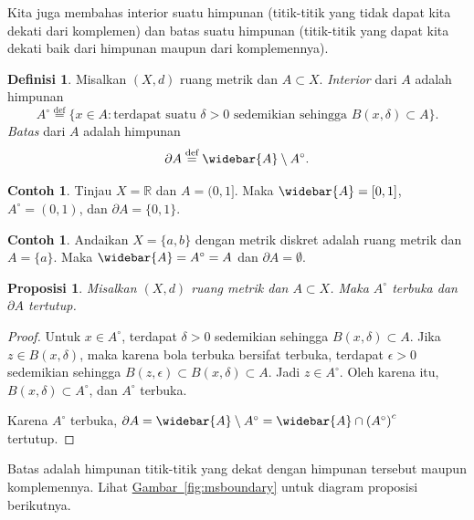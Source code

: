 \documentclass[12pt,openany]{book}
\newcommand{\R}{{\mathbb{R}}}
\newcommand{\myindex}[1]{#1\index{#1}}
\theoremstyle{plain}
\newtheorem{prop}[thm]{Proposisi}
\theoremstyle{remark}
\theoremstyle{definition}
\newtheorem{defn}[thm]{Definisi}
\theoremstyle{exercise}
\theoremstyle{example}
\newtheorem{example}[thm]{Contoh}
\newcommand{\figureref}[1]{\hyperref[#1]{Gambar~\ref*{#1}}}
\begin{document}
Kita juga membahas interior suatu himpunan
(titik-titik yang tidak dapat kita dekati dari komplemen)
dan batas suatu himpunan (titik-titik yang dapat kita
dekati baik dari himpunan maupun dari komplemennya).

\begin{defn}
Misalkan $(X,d)$ ruang metrik dan $A \subset X$.
\emph{\myindex{Interior}} dari $A$ adalah himpunan
%
\begin{equation*}
A^\circ \overset{\text{def}}{=} \{ x \in A : \text{terdapat suatu } \delta > 0
\text{ sedemikian sehingga } B(x,\delta) \subset A \} .
\end{equation*}
\emph{\myindex{Batas}} dari $A$ adalah himpunan
%
\begin{equation*}
\partial A \overset{\text{def}}{=} \widebar{A}\setminus A^\circ.
\end{equation*}
\end{defn}

\begin{example}
Tinjau $X = \R$ dan $A=(0,1]$. Maka $\widebar{A}=[0,1]$, $A^\circ = (0,1)$,
dan $\partial A = \{ 0, 1 \}$.
\end{example}

\begin{example}
Andaikan $X = \{ a, b \}$ dengan metrik diskret adalah ruang metrik
dan
$A = \{ a \}$. Maka $\widebar{A} = A^\circ = A$ dan $\partial A =
\emptyset$.
\end{example}


\begin{prop}
Misalkan $(X,d)$ ruang metrik dan $A \subset X$. Maka $A^\circ$ terbuka
dan $\partial A$ tertutup.
\end{prop}

\begin{proof}
Untuk $x \in A^\circ$, terdapat $\delta > 0$ sedemikian sehingga $B(x,\delta)
\subset A$. Jika $z \in B(x,\delta)$, maka karena bola terbuka bersifat terbuka,
terdapat $\epsilon > 0$ sedemikian sehingga $B(z,\epsilon) \subset B(x,\delta)
\subset A$. Jadi $z \in A^\circ$. Oleh karena itu, $B(x,\delta) \subset
A^\circ$, dan $A^\circ$ terbuka.

Karena $A^\circ$ terbuka,
$\partial A = \widebar{A} \setminus A^\circ = \widebar{A} \cap
{(A^\circ)}^c$ tertutup.
\end{proof}

Batas adalah himpunan titik-titik yang dekat dengan himpunan tersebut maupun
komplemennya. Lihat \figureref{fig:msboundary} untuk diagram
proposisi berikutnya.
\end{document}
